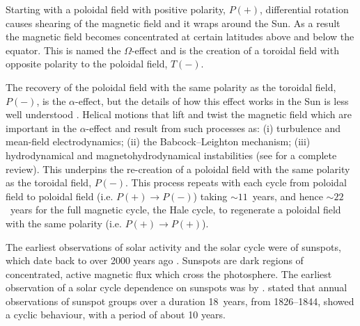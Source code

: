 Starting with a poloidal field with positive polarity, $P(+)$, differential rotation causes shearing of the magnetic field and it wraps around the Sun. As a result the magnetic field becomes concentrated at certain latitudes above and below the equator. This is named the $\Omega$-effect and is the creation of a toroidal field with opposite polarity to the poloidal field, $T(-)$. 

The recovery of the poloidal field with the same polarity as the toroidal field, $P(-)$, is the $\alpha$-effect, but the details of how this effect works in the Sun is less well understood \citep{hathaway_solar_2015}. Helical motions that lift and twist the magnetic field which are important in the $\alpha$-effect \citep{babcock_topology_1961} and result from such processes as: (i) turbulence and mean-field electrodynamics; (ii) the Babcock–Leighton mechanism; (iii) hydrodynamical and magnetohydrodynamical instabilities (see \citet{charbonneau_dynamo_2020} for a complete review). This underpins the re-creation of a poloidal field with the same polarity as the toroidal field, $P(-)$. This process repeats with each cycle from poloidal field to poloidal field (i.e. $P(+)\rightarrow P(-)$) taking $\sim11$~years, and hence $\sim22$~years for the full magnetic cycle, the Hale cycle, to regenerate a poloidal field with the same polarity (i.e. $P(+)\rightarrow P(+)$).%


The earliest observations of solar activity and the solar cycle were of sunspots, which date back to over 2000 years ago \citep{clark_interpretation_1978}. Sunspots are dark regions of concentrated, active magnetic flux which cross the photosphere. The earliest observation of a solar cycle dependence on sunspots was by \citet{schwabe_sonnenbeobachtungen_1844}. \citet{schwabe_sonnenbeobachtungen_1844} stated that annual observations of sunspot groups over a duration 18~years, from 1826--1844, showed a cyclic behaviour, with a period of about 10 years.

